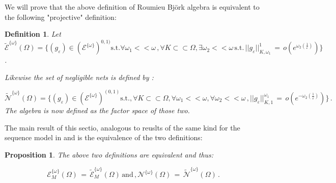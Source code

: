 \documentclass[12pt,a4paper]{amsart}
\newtheorem{proposition}[theorem]{Proposition}
\newtheorem{definition}[theorem]{Definition}
\begin{document}
  We will prove that the above definition of Roumieu Bj\"{o}rk algebra is equivalent to the following "projective" definition:
  \begin{definition}
 Let 
$$  \tilde{\mathcal{E}}^{\{\omega\}} (\Omega) = 
\{(g_{\varepsilon}) \in (\mathcal{E}^{\{\omega\}})^{0,1)} \mbox{s.t.} \forall \omega_1 <<\omega\,,
 \forall K \subset \subset \Omega, \exists \omega_2 <<\omega\, \mbox{s.t.}\,
  ||g_{\varepsilon}||_ {K,\omega_1}^1\, =
 \, o(e^{\omega_2(\frac{1}{\varepsilon})}) \}$$.

 
Likewise the set of negligible nets is defined by :
  
$$  \tilde{\mathcal{N}}^{\{\omega \}} (\Omega) =
  \{(g_{\varepsilon}) \in 
  (\mathcal{E}^{\{\omega\}})^{(0,1)} \mbox{s.t.},
 \forall K \subset \subset \Omega , \forall \omega_1<<
 \omega,
 \forall \omega_2 <<\omega\,,
 ||g_{\varepsilon}||_ {K,1}^{\omega_1}\,=
 \, o(e^{-\omega_2(\frac{1}{\varepsilon})}) \}\,.$$
 The algebra is now defined as the factor space of those two.
 \end{definition}
 
  The main result of this sectio, analogous to reuslts of the same kind for the sequence model in \cite{D.V.V.} and \cite{P.R.S.Z} is the equivalence of the two definitions:
  \begin{proposition}
 The above two definitions are  equivalent and thus:
   
 $$\,\mathcal{E}^{\{\omega\}}_M(\Omega)\,
 = \,\tilde{\mathcal{E}}^{\{\omega\}}_M (\Omega)\,
 \mbox{and}\,,
 \mathcal{N}^{\{\omega\}}(\Omega)\,
 =\,\tilde{\mathcal{N}}^{\{\omega \}} (\Omega)\,.$$
  
  \end{proposition}
  
\end{document}
